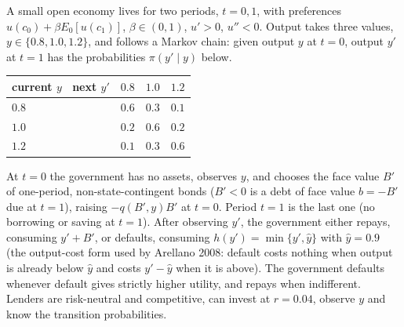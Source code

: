 \documentclass[11pt,a4paper]{article}
\begin{document}
A small open economy lives for two periods, \(t = 0, 1\), with preferences
\(u(c_0) + \beta E_0[u(c_1)]\), \(\beta \in (0,1)\), \(u' > 0\), \(u'' < 0\). Output takes three
values, \(y \in \{0.8, 1.0, 1.2\}\), and follows a Markov chain: given output \(y\) at \(t = 0\),
output \(y'\) at \(t = 1\) has the probabilities \(\pi(y' \mid y)\) below.

{\def\LTcaptype{none} %
\begin{longtable}[]{@{}llll@{}}
\toprule\noalign{}
current \(y\) ~next \(y'\) & \(0.8\) & \(1.0\) & \(1.2\) \\
\midrule\noalign{}
\endhead
\bottomrule\noalign{}
\endlastfoot
\(0.8\) & \(0.6\) & \(0.3\) & \(0.1\) \\
\(1.0\) & \(0.2\) & \(0.6\) & \(0.2\) \\
\(1.2\) & \(0.1\) & \(0.3\) & \(0.6\) \\
\end{longtable}
}

At \(t = 0\) the government has no assets, observes \(y\), and chooses the face value \(B'\) of
one-period, non-state-contingent bonds (\(B' < 0\) is a debt of face value \(b = -B'\) due at
\(t = 1\)), raising \(-q(B', y)B'\) at \(t = 0\). Period \(t = 1\) is the last one (no borrowing or
saving at \(t = 1\)). After observing \(y'\), the government either repays, consuming \(y' + B'\),
or defaults, consuming \(h(y') = \min\{y', \hat y\}\) with \(\hat y = 0.9\) (the output-cost form
used by Arellano 2008: default costs nothing when output is already below \(\hat y\) and costs
\(y' - \hat y\) when it is above). The government defaults whenever default gives strictly higher
utility, and repays when indifferent. Lenders are risk-neutral and competitive, can invest at
\(r = 0.04\), observe \(y\) and know the transition probabilities.
\end{document}
